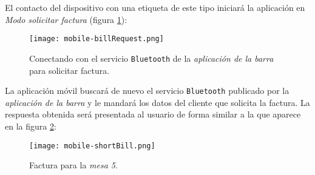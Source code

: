 El contacto del dispositivo con una etiqueta de este tipo iniciará la
aplicación en \emph{Modo solicitar factura} (figura
\ref{fig:mobile-billRequest}):

  \begin{figure}[H]
    \begin{center}
      \texttt{[image: mobile-billRequest.png]}
      \caption{Conectando con el servicio \texttt{Bluetooth} de la
      \emph{aplicación de la barra} para solicitar factura.}
      \label{fig:mobile-billRequest}
    \end{center}
  \end{figure}

La aplicación móvil buscará de nuevo el servicio \texttt{Bluetooth} publicado
por la \emph{aplicación de la barra} y le mandará los datos del cliente que
solicita la factura. La respuesta obtenida será presentada al usuario de
forma similar a la que aparece en la figura \ref{fig:mobile-shortBill}:

  \begin{figure}[H]
    \begin{center}
      \texttt{[image: mobile-shortBill.png]}
      \caption{Factura para la \emph{mesa 5}.}
      \label{fig:mobile-shortBill}
    \end{center}
  \end{figure}

